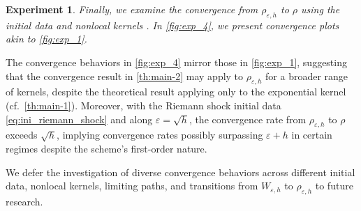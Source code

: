 \documentclass[10pt]{amsart}
\theoremstyle{plain}
\newtheorem{example}{Experiment}[section]
\theoremstyle{definition}
\numberwithin{equation}{section}
\newcommand{\eps}{{\varepsilon}}
\begin{document}
\begin{example}
Finally, we examine the convergence from $\rho_{\eps,h}$ to $\rho$ using the initial data  and nonlocal kernels . In \cref{fig:exp_4}, we present convergence plots akin to \cref{fig:exp_1}.
\end{example}

The convergence behaviors in \cref{fig:exp_4} mirror those in \cref{fig:exp_1}, suggesting that the convergence result in \cref{th:main-2} may apply to $\rho_{\varepsilon,h}$ for a broader range of kernels, despite the theoretical result applying only to the exponential kernel (cf.~\cref{th:main-1}). Moreover, with the Riemann shock initial data \cref{eq:ini_riemann_shock} and along $\eps=\sqrt{h}$, the convergence rate from $\rho_{\eps,h}$ to $\rho$ exceeds $\sqrt{h}$, implying convergence rates possibly surpassing $\eps+h$ in certain regimes despite the scheme's first-order nature.

We defer the investigation of diverse convergence behaviors across different initial data, nonlocal kernels, limiting paths, and transitions from $W_{\varepsilon,h}$ to $\rho_{\varepsilon,h}$ to future research.
\end{document}
